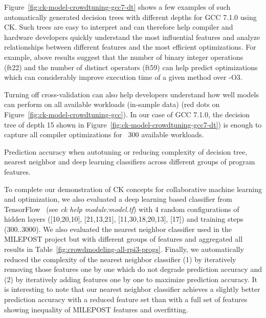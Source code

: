 Figure~\ref{fig:ck-model-crowdtuning-gcc7-dt} shows a few examples of such automatically
generated decision trees with different depths for GCC 7.1.0 using CK.
%
Such trees are easy to interpret and can therefore help compiler and hardware 
developers quickly understand the most influential features and analyze
relationships between different features and the most efficient
optimizations.
%
For example, above results suggest that the number of binary integer operations (ft22) 
and the number of distinct operators (ft59) can help predict optimizations 
which can considerably improve execution time of a given method over -O3.

Turning off cross-validation can also help developers understand 
how well models can perform on all available workloads (in-sample data)
(red dots on Figure~\ref{fig:ck-model-crowdtuning-gcc}).
%
In our case of GCC 7.1.0, the decision tree of depth 15 shown in Figure~\ref{fig:ck-model-crowdtuning-gcc7-dt})
is enough to capture all compiler optimizations for ~300 available workloads.

  \begin{table}[!htbp]
    \centering
    {\small
    }
    \caption{
     Prediction accuracy when autotuning or reducing complexity of decision tree, 
     nearest neighbor and deep learning classifiers
     across different groups of program features.
    }
    \label{fig:crowdmodeling-all-rpi3-progs}
  \end{table}

To complete our demonstration of CK concepts for collaborative machine learning and optimization,
we also evaluated a deep learning based classifier from TensorFlow~\cite{DBLP:journals/corr/AbadiABBCCCDDDG16}
(see \emph{ck help module:model.tf})
with 4 random configurations of hidden layers ([10,20,10], [21,13,21], [11,30,18,20,13], [17]) 
and training steps (300..3000).
%
We also evaluated the nearest neighbor classifier used in the MILEPOST project but with different groups of features 
and aggregated all results in Table~\ref{fig:crowdmodeling-all-rpi3-progs}. 
%
Finally, we automatically reduced the complexity of the nearest neighbor classifier (1) by iteratively removing those features one by one
which do not degrade prediction accuracy and (2) by iteratively adding features one by one to maximize prediction accuracy.
%
It is interesting to note that our nearest neighbor classifier achieves
a slightly better prediction accuracy with a reduced feature set than with 
a full set of features showing inequality of MILEPOST features
and overfitting.

